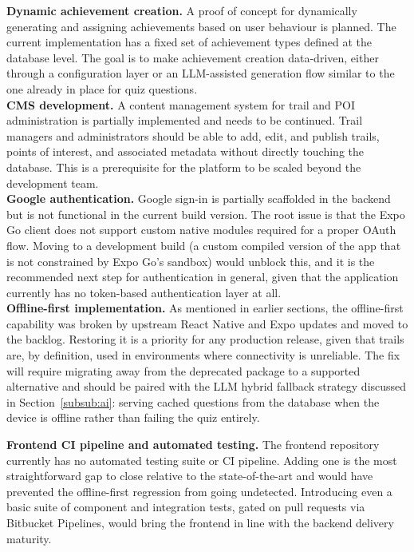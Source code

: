 \documentclass[11pt,a4paper]{article}
\begin{document}
\textbf{Dynamic achievement creation.}
A proof of concept for dynamically generating and assigning achievements based on user behaviour is planned.
The current implementation has a fixed set of achievement types defined
at the database level.
The goal is to make achievement creation data-driven, either through a configuration layer or an LLM-assisted generation flow similar to the one already in place for quiz questions.\\
 
\textbf{CMS development.}
A content management system for trail and POI administration is partially implemented and needs to be continued.
Trail managers and administrators should be able to add, edit, and publish trails, points of interest, and associated metadata without directly touching the database.
This is a prerequisite for the platform to be scaled beyond the development team.\\
 
\textbf{Google authentication.}
Google sign-in is partially scaffolded in the backend but is not functional in the current build version. The root issue is that the Expo Go client does not support custom native modules required for a proper OAuth flow.
Moving to a development build (a custom compiled version of the app that is not constrained by Expo Go's sandbox) would unblock this, and it is the recommended next step for authentication in general, given that the application currently has no token-based authentication layer at all.\\
 
\textbf{Offline-first implementation.}
As mentioned in earlier sections, the offline-first capability was broken by upstream React Native and Expo updates and moved to the backlog. 
Restoring it is a priority for any production release, given that trails are, by definition, used in environments where connectivity is unreliable.
The fix will require migrating away from the deprecated package to a supported alternative and should be paired with the LLM hybrid fallback strategy discussed in Section~\ref{subsub:ai}: serving cached questions from the database when the device is offline rather than failing the quiz entirely.\\
\newpage
 
\textbf{Frontend CI pipeline and automated testing.}
The frontend repository currently has no automated testing suite or CI pipeline. Adding one is the most straightforward gap to close relative to the state-of-the-art and would have prevented the offline-first regression from going undetected.
Introducing even a basic suite of component and integration tests, gated on pull requests via Bitbucket Pipelines, would bring the frontend in line with the backend delivery maturity.\\
 
\end{document}
